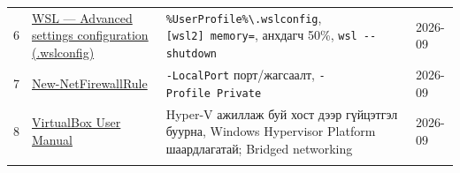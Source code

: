 \begin{longtable}[]{@{}llll@{}}
\begin{minipage}[t]{0.22\columnwidth}\raggedright
6\strut
\end{minipage} & \begin{minipage}[t]{0.22\columnwidth}\raggedright
\href{https://learn.microsoft.com/en-us/windows/wsl/wsl-config}{WSL --- Advanced settings configuration (.\allowbreak{}wslconfig)}\strut
\end{minipage} & \begin{minipage}[t]{0.22\columnwidth}\raggedright
\texttt{\%UserProfile\%\textbackslash{}\allowbreak{}.\allowbreak{}wslconfig}, \texttt{{[}wsl2{]}\ memory=\allowbreak{}}, анхдагч 50\%, \texttt{wsl\ -\/\allowbreak{}-shutdown}\strut
\end{minipage} & \begin{minipage}[t]{0.22\columnwidth}\raggedright
2026-09\strut
\end{minipage}\tabularnewline
\begin{minipage}[t]{0.22\columnwidth}\raggedright
7\strut
\end{minipage} & \begin{minipage}[t]{0.22\columnwidth}\raggedright
\href{https://learn.microsoft.com/en-us/powershell/module/netsecurity/new-netfirewallrule}{New-NetFirewallRule}\strut
\end{minipage} & \begin{minipage}[t]{0.22\columnwidth}\raggedright
\texttt{-LocalPort} порт/жагсаалт, \texttt{-Profile\ Private}\strut
\end{minipage} & \begin{minipage}[t]{0.22\columnwidth}\raggedright
2026-09\strut
\end{minipage}\tabularnewline
\begin{minipage}[t]{0.22\columnwidth}\raggedright
8\strut
\end{minipage} & \begin{minipage}[t]{0.22\columnwidth}\raggedright
\href{https://www.virtualbox.org/manual/UserManual.html}{VirtualBox User Manual}\strut
\end{minipage} & \begin{minipage}[t]{0.22\columnwidth}\raggedright
Hyper-V ажиллаж буй хост дээр гүйцэтгэл буурна, Windows Hypervisor Platform шаардлагатай; Bridged networking\strut
\end{minipage} & \begin{minipage}[t]{0.22\columnwidth}\raggedright
2026-09\strut
\end{minipage}\tabularnewline
\begin{minipage}[t]{0.22\columnwidth}\raggedright

\end{minipage}
\end{longtable}
